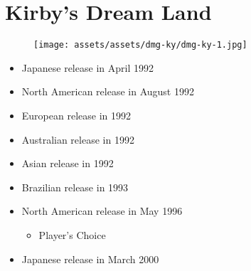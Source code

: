 \documentclass{book}
\begin{document}
\begingroup \chapter*{Kirby’s Dream Land} \endgroup
\begin{figure}[H]
\vskip 4pt
\centering
\texttt{[image: assets/assets/dmg-ky/dmg-ky-1.jpg]}\end{figure}
\begin{itemize} [nosep]




\item Japanese release in April 1992







\item North American release in August 1992







\item European release in 1992







\item Australian release in 1992







\item Asian release in 1992







\item Brazilian release in 1993







\item North American release in May 1996
\begin{itemize} [nosep]\item Player’s Choice\end{itemize}\noindent






\item Japanese release in March 2000






































\end{itemize}
\end{document}
